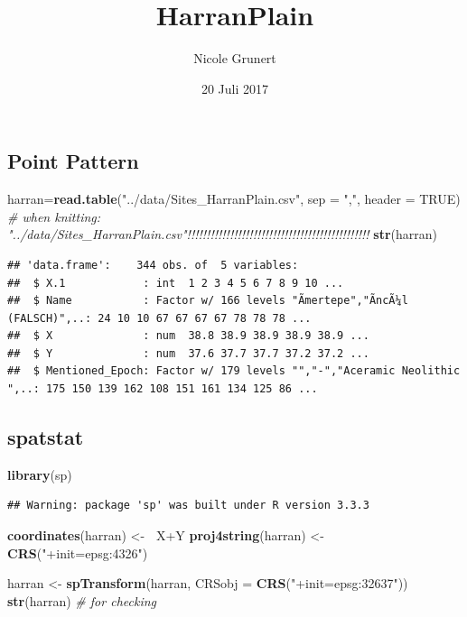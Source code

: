 \documentclass[]{article}
\title{HarranPlain}
\author{Nicole Grunert}
\date{20 Juli 2017}
\newenvironment{Shaded}{\begin{snugshade}}{\end{snugshade}}
\newcommand{\KeywordTok}[1]{\textcolor[rgb]{0.13,0.29,0.53}{\textbf{{#1}}}}
\newcommand{\DataTypeTok}[1]{\textcolor[rgb]{0.13,0.29,0.53}{{#1}}}
\newcommand{\StringTok}[1]{\textcolor[rgb]{0.31,0.60,0.02}{{#1}}}
\newcommand{\CommentTok}[1]{\textcolor[rgb]{0.56,0.35,0.01}{\textit{{#1}}}}
\newcommand{\OtherTok}[1]{\textcolor[rgb]{0.56,0.35,0.01}{{#1}}}
\newcommand{\ErrorTok}[1]{\textcolor[rgb]{0.64,0.00,0.00}{\textbf{{#1}}}}
\newcommand{\NormalTok}[1]{{#1}}
\begin{document}
\maketitle

{
\setcounter{tocdepth}{2}
\tableofcontents
}
\subsection{Point Pattern}\label{point-pattern}

\begin{Shaded}
\begin{Highlighting}[]
\NormalTok{harran=}\KeywordTok{read.table}\NormalTok{(}\StringTok{"../data/Sites_HarranPlain.csv"}\NormalTok{,}
           \DataTypeTok{sep =} \StringTok{","}\NormalTok{,}
           \DataTypeTok{header =} \OtherTok{TRUE}\NormalTok{)   }\CommentTok{# when knitting: "../data/Sites_HarranPlain.csv"!!!!!!!!!!!!!!!!!!!!!!!!!!!!!!!!!!!!!!!!!!!!!!!}
\KeywordTok{str}\NormalTok{(harran)}
\end{Highlighting}
\end{Shaded}

\begin{verbatim}
## 'data.frame':    344 obs. of  5 variables:
##  $ X.1            : int  1 2 3 4 5 6 7 8 9 10 ...
##  $ Name           : Factor w/ 166 levels "Ãmertepe","ÃncÃ¼l (FALSCH)",..: 24 10 10 67 67 67 67 78 78 78 ...
##  $ X              : num  38.8 38.9 38.9 38.9 38.9 ...
##  $ Y              : num  37.6 37.7 37.7 37.2 37.2 ...
##  $ Mentioned_Epoch: Factor w/ 179 levels "","-","Aceramic Neolithic ",..: 175 150 139 162 108 151 161 134 125 86 ...
\end{verbatim}

\subsection{spatstat}\label{spatstat}

\begin{Shaded}
\begin{Highlighting}[]
\KeywordTok{library}\NormalTok{(sp)}
\end{Highlighting}
\end{Shaded}

\begin{verbatim}
## Warning: package 'sp' was built under R version 3.3.3
\end{verbatim}

\begin{Shaded}
\begin{Highlighting}[]
\KeywordTok{coordinates}\NormalTok{(harran) <-}\StringTok{ }\ErrorTok{~}\NormalTok{X+Y}
\KeywordTok{proj4string}\NormalTok{(harran) <-}\StringTok{ }\KeywordTok{CRS}\NormalTok{(}\StringTok{"+init=epsg:4326"}\NormalTok{)}

\NormalTok{harran <-}\StringTok{ }\KeywordTok{spTransform}\NormalTok{(harran, }\DataTypeTok{CRSobj =} \KeywordTok{CRS}\NormalTok{(}\StringTok{"+init=epsg:32637"}\NormalTok{))}
\KeywordTok{str}\NormalTok{(harran) }\CommentTok{# for checking}
\end{Highlighting}
\end{Shaded}
\end{document}
